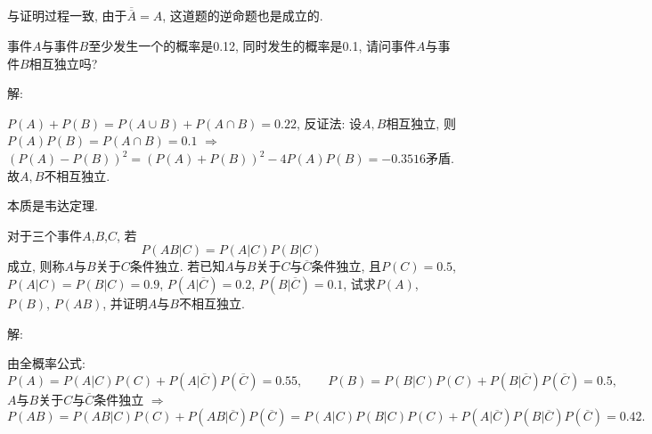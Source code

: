 \documentclass[standard]{ExBook}
\begin{document}
\begin{qitems}
\vspace{-5em}

    \begin{bbox}
\textcolor{themeColor}{\selectfont {} 与证明过程一致, 由于$\overline{\overline{A}}=A$, 这道题的逆命题也是成立的.}
    \end{bbox}

\vspace{-5em}

    \begin{bbox}
    \begin{shaded}
        \qitem
事件$A$与事件$B$至少发生一个的概率是0.12, 同时发生的概率是0.1, 请问事件$A$与事件$B$相互独立吗?
    \end{shaded}
    \end{bbox}

\vspace{-5em}

    \begin{bbox}
解:

$P(A)+P(B)=P(A\cup B)+P(A\cap B)=0.22$, 反证法: 设$A,B$相互独立, 则$P(A)P(B)=P(A\cap B)=0.1$ $\Longrightarrow$ $\left(P(A)-P(B)\right)^2=\left(P(A)+P(B)\right)^2-4P(A)P(B)=-0.3516$矛盾. 故$A,B$不相互独立.

\textcolor{themeColor}{\selectfont {} 本质是韦达定理.}
    \end{bbox}

\vspace{-5em}

    \begin{bbox}
    \begin{shaded}
        \qitem
对于三个事件$A$,$B$,$C$, 若
$$P(AB|C)=P(A|C)P(B|C)$$
成立, 则称$A$与$B$关于$C$条件独立. 若已知$A$与$B$关于$C$与$\overline{C}$条件独立, 且$P(C)=0.5$, $P(A|C)=P(B|C)=0.9$, $P(A|\overline{C})=0.2$, $P(B|\overline{C})=0.1$, 试求$P(A)$, $P(B)$, $P(AB)$, 并证明$A$与$B$不相互独立.
    \end{shaded}
    \end{bbox}

\vspace{-5em}

    \begin{bbox}
解:

由全概率公式:
$$P(A)=P(A|C)P(C)+P(A|\overline{C})P(\overline{C})=0.55,\qquad P(B)=P(B|C)P(C)+P(B|\overline{C})P(\overline{C})=0.5,$$
$A$与$B$关于$C$与$\overline{C}$条件独立 $\Longrightarrow$
$$P(AB)=P(AB|C)P(C)+P(AB|\overline{C})P(\overline{C})=P(A|C)P(B|C)P(C)+P(A|\overline{C})P(B|\overline{C})P(\overline{C})=0.42.$$
    \end{bbox}


\end{qitems}
\end{document}

